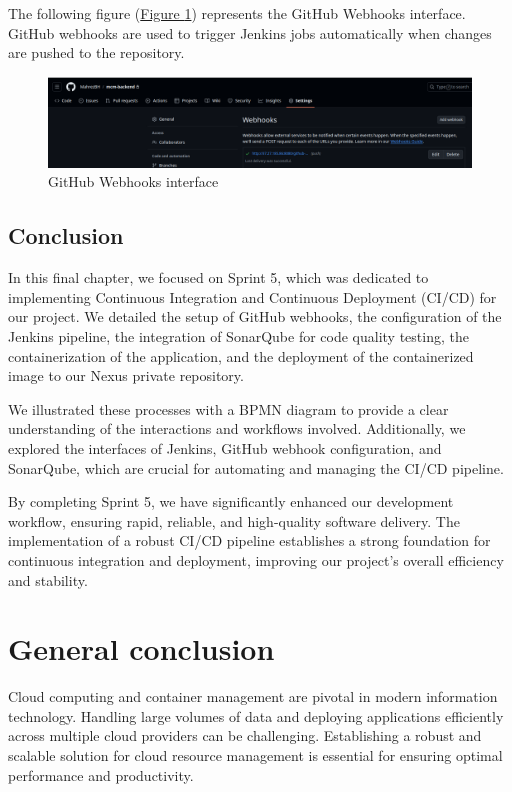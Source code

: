 The following figure (\hyperref[fig:webhook]{Figure \ref{fig:jenkins}})  represents the GitHub Webhooks interface.
GitHub webhooks are used to trigger Jenkins jobs automatically when changes are pushed to the repository.
\begin{figure}[h]
  \center
  \includegraphics[width=14cm]{./chapters/sprint5/webhook.png}
  \caption{GitHub Webhooks interface}
  \label{fig:jenkins}
\end{figure}

\section*{Conclusion}
In this final chapter, we focused on Sprint 5, which was dedicated to implementing Continuous Integration and Continuous Deployment (CI/CD) for our project. We detailed the setup of GitHub webhooks, the configuration of the Jenkins pipeline, the integration of SonarQube for code quality testing, the containerization of the application, and the deployment of the containerized image to our Nexus private repository.

We illustrated these processes with a BPMN diagram to provide a clear understanding of the interactions and workflows involved. Additionally, we explored the interfaces of Jenkins, GitHub webhook configuration, and SonarQube, which are crucial for automating and managing the CI/CD pipeline.

By completing Sprint 5, we have significantly enhanced our development workflow, ensuring rapid, reliable, and high-quality software delivery. The implementation of a robust CI/CD pipeline establishes a strong foundation for continuous integration and deployment, improving our project's overall efficiency and stability.
\chapter*{General conclusion}

Cloud computing and container management are pivotal in modern information technology. Handling large volumes of data and deploying applications efficiently across multiple cloud providers can be challenging. Establishing a robust and scalable solution for cloud resource management is essential for ensuring optimal performance and productivity.

